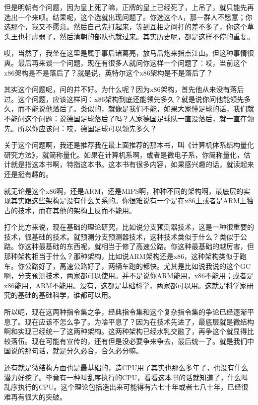 \documentclass[
  letterpaper,
  DIV=11,
  numbers=noendperiod]{scrreprt}
\begin{document}
但是明朝有个问题，因为皇上死了嘛，正牌的皇上已经死了，上吊了，就只能先再选出一个来呗。结果呢，这个选就出现问题了。你选这个A，那一群人不愿意；你选那个，我又不愿意。然后自己先打起来，等到互相之间打的差不多了，你这个草头王也打虚弱了，然后清朝的部队也就过来。其实历史呢，都是这样不停的重复。

哎，当然了，我坐在这里是属于事后诸葛亮，放马后炮来指点江山。但这种事情很爽。最后再来谈一个问题，现在有很多人就问你这样一个问题了：哎，当前这个x86架构是不是落后了？就是说，英特尔这个x86架构是不是落后了？

其实这个问题呢，问的并不好。为什么呢？因为x86架构，首先他从来没有落后过。这个问题，应该这样问：x86架构到底还能领先多久？就是说你问他能领先多久，而不能说他落后了。类似的，就像是我们不能，如果大家懂足球的话，我们就不能问这个问题：说德国足球落后了吗？人家德国足球队一直没落后，就一直在领先。所以你应该问：哎，德国足球可以领先多久？

关于这个问题啊，我还是推荐我在最上面推荐的那本书，叫《计算机体系结构量化研究方法》，就简称量化。如果在计算机系啊，或者是微电子系，你简称量化，估计就是指这本书啊，特指这本书。这本书有很多内容，如果感兴趣的话，就读起来还是挺有趣的。

就无论是这个x86啊，还是ARM，还是MIPS啊，种种不同的架构啊，最底层的实现其实跟这些架构是没有什么关系的。你很难说有一个是在x86上或者是ARM上独占的技术，而在其他的架构上反而不能用。

打个比方来说，现在基础的理论研究，比如说分支预测器技术，这是一种很重要的技术，很基础的技术。就预测分支预测器技术，这种技术类似于什么？类似于公路。你这种最基础的东西呢，就相当于修了高速公路。你这种最基础的越厉害，但那种架构相当于什么？那种架构，比如说ARM架构还是x86，这种架构类似于跑车。你公路好了，高速公路好了，两辆车跑的都快。尤其是比如说我说的这个GC啊，分支预测技术，两家都可以使用。并不是说你ARM能用，x86不能用；或者是x86能用，ARM不能用。没有，这都是基础科学，两家都可以用。这就是科学家研究的基础的基础科学，谁都可以用。

所以呢，现在这两种指令集之争，经典指令集和这个复杂指令集的争论已经逐渐平息了。现在应该不怎么争了。为啥平息了？因为在技术先进了，最底层就是微结构啊和实现已经统一了这两种架构。这两种架构已经水乳交融了，再争这个就显得比较落伍。现在可能有宣传的，还有但是没必要争来争去，最后统一了。就是我们中国说的那句话，就是分久必合，合久必分嘛。

还有就是微结构方面也是最基础的，造CPU用了其实也那么多年了，也没有什么潜力好挖了。毕竟有一种叫乱序执行的CPU，看看这本书的话就知道了，什么叫乱序执行的CPU。这个理论包括造出来可能得有六七十年或者七八十年，已经很难再有很大的突破。
\end{document}

